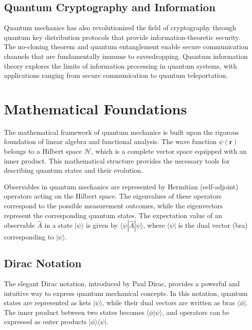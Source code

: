\documentclass[11pt,a4paper]{article}
\begin{document}
\subsection{Quantum Cryptography and Information}

Quantum mechanics has also revolutionized the field of cryptography through quantum key distribution protocols that provide information-theoretic security. The no-cloning theorem and quantum entanglement enable secure communication channels that are fundamentally immune to eavesdropping. Quantum information theory explores the limits of information processing in quantum systems, with applications ranging from secure communication to quantum teleportation.

\section{Mathematical Foundations}

The mathematical framework of quantum mechanics is built upon the rigorous foundation of linear algebra and functional analysis. The wave function $\psi(\mathbf{r})$ belongs to a Hilbert space $\mathcal{H}$, which is a complete vector space equipped with an inner product. This mathematical structure provides the necessary tools for describing quantum states and their evolution.

Observables in quantum mechanics are represented by Hermitian (self-adjoint) operators acting on the Hilbert space. The eigenvalues of these operators correspond to the possible measurement outcomes, while the eigenvectors represent the corresponding quantum states. The expectation value of an observable $\hat{A}$ in a state $|\psi\rangle$ is given by $\langle \psi | \hat{A} | \psi \rangle$, where $\langle \psi |$ is the dual vector (bra) corresponding to $|\psi\rangle$.

\subsection{Dirac Notation}

The elegant Dirac notation, introduced by Paul Dirac, provides a powerful and intuitive way to express quantum mechanical concepts. In this notation, quantum states are represented as kets $|\psi\rangle$, while their dual vectors are written as bras $\langle \phi |$. The inner product between two states becomes $\langle \phi | \psi \rangle$, and operators can be expressed as outer products $|\phi\rangle\langle\psi|$.
\end{document}
